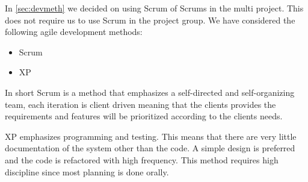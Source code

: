 In \autoref{sec:devmeth} we decided on using Scrum of Scrums in the multi project.
This does not require us to use Scrum in the project group.
We have considered the following agile development methods:

\begin{itemize}
\item Scrum
\item XP
\end{itemize} 

In short Scrum is a method that emphasizes a self-directed and self-organizing team, each iteration is client driven meaning that the clients provides the requirements and features will be prioritized according to the clients needs\cite{larman}.

XP emphasizes programming and testing. This means that there are very little documentation of the system other than the code. A simple design is preferred and the code is refactored with high frequency. This method requires high discipline since most planning is done orally\cite{larman}.
